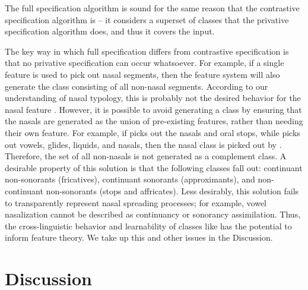 \documentclass[11pt, oneside]{article}   	%
\begin{document}
\vspace{\baselineskip} \noindent The full specification algorithm is sound for the same reason that the contrastive specification algorithm is -- it considers a superset of classes that the privative specification algorithm does, and thus it covers the input.

\vspace{\baselineskip} The key way in which full specification differs from contrastive specification is that no privative specification can occur whatsoever. For example, if a single feature  is used to pick out nasal segments, then the feature system will also generate the class  consisting of all non-nasal segments. According to our understanding of nasal typology, this is probably not the desired behavior for the nasal feature \cite{TODO}. However, it is possible to avoid generating a  class by ensuring that the nasals are generated as the union of pre-existing features, rather than needing their own feature. For example, if  picks out the nasals and oral stops, while  picks out vowels, glides, liquids, and nasals, then the nasal class is picked out by . Therefore, the set of all non-nasals is not generated as a complement class. A desirable property of this solution is that the following classes fall out: continuant non-sonorants (fricatives), continuant sonorants (approximants), and non-continuant non-sonorants (stops and affricates). Less desirably, this solution fails to transparently represent nasal spreading processes; for example, vowel nasalization cannot be described as continuancy or sonorancy assimilation. Thus, the cross-linguistic behavior and learnability of classes like  has the potential to inform feature theory. We take up this and other issues in the Discussion.

\section{Discussion}
\end{document}
